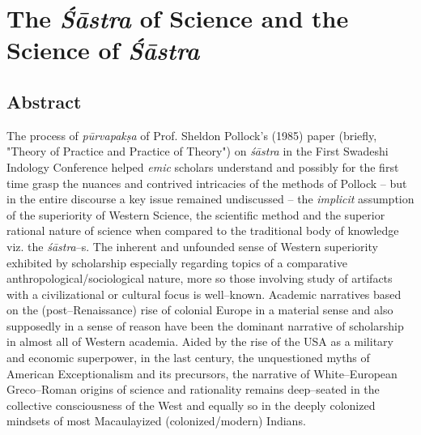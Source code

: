 
\chapter{The \textit{Śāstra} of Science and the Science of \textit{Śāstra}}


\vskip 2pt

\section*{Abstract}

\vskip 2pt

The process of \textit{pūrvapakṣa} of Prof. Sheldon Pollock’s (1985) paper (briefly, "Theory of Practice and Practice of Theory") on \textit{śāstra} in the First Swadeshi Indology Conference helped \textit{emic} scholars understand and possibly for the first time grasp the nuances and contrived intricacies of the methods of Pollock – but in the entire discourse a key issue remained undiscussed – the \textit{implicit} assumption of the superiority of Western Science, the scientific method and the superior rational nature of science when compared to the traditional body of knowledge viz. the \textit{śāstra}–s. The inherent and unfounded sense of Western superiority exhibited by scholarship especially regarding topics of a comparative anthropological/sociological nature, more so those involving study of artifacts with a civilizational or cultural focus is well–known. Academic narratives based on the (post–Renaissance) rise of colonial Europe in a material sense and also supposedly in a sense of reason have been the dominant narrative of scholarship in almost all of Western academia. Aided by the rise of the USA as a military and economic superpower, in the last century, the unquestioned myths of American Exceptionalism and its precursors, the narrative of White–European Greco–Roman origins of science and rationality remains deep–seated in the collective consciousness of the West and equally so in the deeply colonized mindsets of most Macaulayized (colonized/modern) Indians.

